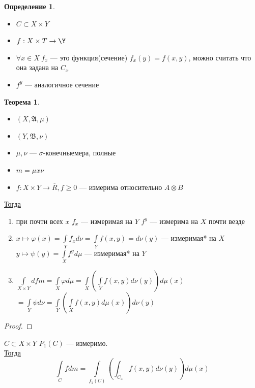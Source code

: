 \documentclass[oneside]{book}
\newcommand{\A}{\mathfrak{A}}
\newcommand{\B}{\mathfrak{B}}
\newcommand{\todo}{{\color{red}\fbox{\text{Доделать}}}}
\theoremstyle{plain}
\theoremstyle{remark}
\theoremstyle{definition}
\newtheorem{theorem}{Теорема}[section]
\newtheorem*{definition}{Определение}
\begin{document}
\begin{definition}
\-
\begin{itemize}
\item \(C \subset X \times Y\)
\item \(f: X \times T \to \Y\)
\item \(\forall x \in X\ f_x\) --- это функция(сечение) \(f_x(y) = f(x, y)\), можно считать что она задана на \(C_x\)
\item \(f^y\) --- аналогичное сечение
\end{itemize}
\end{definition}
\begin{theorem}
\-
\begin{itemize}
\item \((X, \A, \mu)\)
\item \((Y, \B, \nu)\)
\item \(\mu, \nu\) --- \(\sigma\)-конечныемера, полные
\item \(m = \mu x \nu\)
\item \(f: X \times Y \to \overline{R}, f \ge 0\) --- измерима относительно \(A\otimes B\)
\end{itemize}
\uline{Тогда}
\begin{enumerate}
\item при  почти всех \(x\) \(f_x\) --- измеримая на \(Y\) \color{blue}\(f^y\) --- измерима на \(X\) почти везде\color{black}
\item \(x \mapsto \varphi(x)=\int\limits_Y f_x d\nu = \int\limits_Y f(x, y) = d\nu(y)\) --- измеримая* на \(X\) \\
\color{blue}\(y \mapsto \psi(y) = \int\limits_X f^y d\mu\) --- измеримая* на \(Y\)\color{black}
\item \(\int\limits_{X \times Y} d fm = \int\limits_X \varphi d\mu = \int\limits_X\left(\int\limits_Y f(x, y) d\nu(y)\right)d\mu(x)\) \\
\color{blue}\(= \int\limits_Y \psi d\nu = \int\limits_Y\left(\int\limits_X f(x, y) d\mu(x)\right)d\nu(y)\)
\end{enumerate}
\end{theorem}
\begin{proof}
\todo
\end{proof}
\begin{corllary}
\(C \subset X \times Y\) \(P_1(C)\) --- измеримо. \\
\uline{Тогда} \[ \int\limits_C f dm = \int\limits_{f_1(C)}\left(\int_{C_x} f(x, y) d\nu(y)\right)d\mu(x) \]
\end{corllary}
\end{document}
